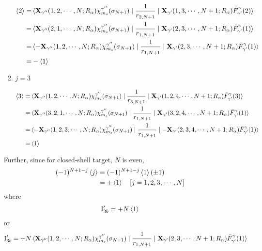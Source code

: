 \documentclass[aps,pra,groupedaddress,12pt,
               amsfonts,amssymb,
               preprint
    ]{revtex4}
\begin{document}
\begin{enumerate}
\begin{enumerate}
  \begin{align*}
    \mathinner{\langle{2}\rangle} = &\mathinner{\langle{{\mathbf{X}_{\gamma''}(1,2,\cdots,N;R_\alpha)\chi_{m_s}^{\gamma''}(\sigma_{N+1})} \mid {\dfrac{1}{r_{2,N+1}}} \mid {\mathbf{X}_{\gamma'}(1,3,\cdots,N+1;R_\alpha)\bar{F}_{\gamma'}^{\gamma}(2)}}\rangle} \\
               = &\mathinner{\langle{{\mathbf{X}_{\gamma''}(2,1,\cdots,N;R_\alpha)\chi_{m_s}^{\gamma''}(\sigma_{N+1})} \mid {\dfrac{1}{r_{1,N+1}}} \mid {\mathbf{X}_{\gamma'}(2,3,\cdots,N+1;R_\alpha)\bar{F}_{\gamma'}^{\gamma}(1)}}\rangle} \\
               = &\mathinner{\langle{{-\mathbf{X}_{\gamma''}(1,2,\cdots,N;R_\alpha)\chi_{m_s}^{\gamma''}(\sigma_{N+1})} \mid {\dfrac{1}{r_{1,N+1}}} \mid {\mathbf{X}_{\gamma'}(2,3,\cdots,N+1;R_\alpha)\bar{F}_{\gamma'}^{\gamma}(1)}}\rangle} \\
               = &-\mathinner{\langle{1}\rangle}
  \end{align*}
\item $j = 3$

  \begin{align*}
    \mathinner{\langle{3}\rangle} = &\mathinner{\langle{{\mathbf{X}_{\gamma''}(1,2,\cdots,N;R_\alpha)\chi_{m_s}^{\gamma''}(\sigma_{N+1})} \mid {\dfrac{1}{r_{3,N+1}}} \mid {\mathbf{X}_{\gamma'}(1,2,4,\cdots,N+1;R_\alpha)\bar{F}_{\gamma'}^{\gamma}(3)}}\rangle} \\
               = &\mathinner{\langle{{\mathbf{X}_{\gamma''}(3,2,1,\cdots,N;R_\alpha)\chi_{m_s}^{\gamma''}(\sigma_{N+1})} \mid {\dfrac{1}{r_{1,N+1}}} \mid {\mathbf{X}_{\gamma'}(3,2,4,\cdots,N+1;R_\alpha)\bar{F}_{\gamma'}^{\gamma}(1)}}\rangle} \\
               = &\mathinner{\langle{{-\mathbf{X}_{\gamma''}(1,2,3,\cdots,N;R_\alpha)\chi_{m_s}^{\gamma''}(\sigma_{N+1})} \mid {\dfrac{1}{r_{1,N+1}}} \mid {-\mathbf{X}_{\gamma'}(2,3,4,\cdots,N+1;R_\alpha)\bar{F}_{\gamma'}^{\gamma}(1)}}\rangle} \\
               = &\mathinner{\langle{1}\rangle}
  \end{align*}
\end{enumerate}

Further, since for closed-shell target, $N$ is even,
\begin{align*}
  (-1)^{N+1-j}\mathinner{\langle{j}\rangle} &=(-1)^{N+1-j}\mathinner{\langle{1}\rangle}(\pm 1) \\
                         &=+\mathinner{\langle{1}\rangle} \quad [j =1,2,3,\cdots,N] 
\end{align*}
where
\begin{equation*}
  \mathrm{I}_{3b}' = +N\mathinner{\langle{1}\rangle}
\end{equation*}
or
\begin{equation}
  \label{eq:intg3j}
  \mathrm{I}_{3b}'=+N\mathinner{\langle{{\mathbf{X}_{\gamma''}(1,2,\cdots,N;R_\alpha)\chi_{m_s}^{\gamma''}(\sigma_{N+1})} \mid {\dfrac{1}{r_{1,N+1}}} \mid {\mathbf{X}_{\gamma'}(2,3,\cdots,N+1;R_\alpha)\bar{F}_{\gamma'}^{\gamma}(1)}}\rangle}
\end{equation}


\end{enumerate}
\end{document}
